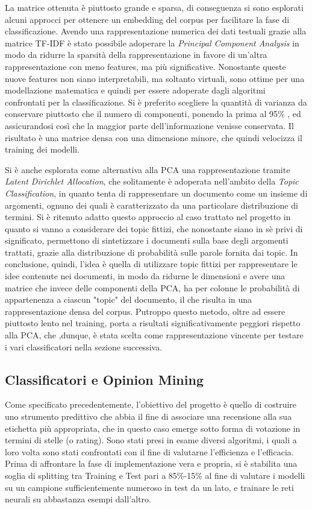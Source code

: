 \documentclass[fleqn,10pt]{SelfArx} %
\begin{document}
La matrice ottenuta è piuttosto grande e sparsa, di conseguenza si sono esplorati alcuni approcci per ottenere un embedding del corpus per facilitare la fase di classificazione.
Avendo una rappresentazione numerica dei dati testuali grazie alla matrice TF-IDF è stato possibile adoperare la \textit{Principal Component Analysis} in modo da ridurre la sparsità della rappresentazione in favore di un'altra rappresentazione con meno features, ma più significative. Nonostante queste nuove features non siano interpretabili, ma soltanto virtuali, sono ottime per una modellazione matematica e quindi per essere adoperate dagli algoritmi confrontati per la classificazione. Si è preferito scegliere la quantità di varianza da conservare piuttosto che il numero di componenti, ponendo la prima al 95\% , ed assicurandosi così che la maggior parte dell'informazione venisse conservata. Il risultato è una matrice densa con una dimensione minore, che quindi velocizza il training dei modelli. 

Si è anche esplorata come alternativa alla PCA una rappresentazione tramite \textit{Latent Dirichlet Allocation}, che solitamente è adoperata nell'ambito della \textit{Topic Classification}, in quanto tenta di rappresentare un documento come un insieme di argomenti, ognuno dei quali è caratterizzato da una particolare distribuzione di termini. Si è ritenuto adatto questo approccio al caso trattato nel progetto in quanto si vanno a considerare dei topic fittizi, che nonostante siano in sè privi di significato, permettono di sintetizzare i documenti sulla base degli argomenti trattati, grazie alla distribuzione di probabilità sulle parole fornita dai topic. In conclusione, quindi, l'idea è quella di utilizzare topic fittizi per rappresentare le idee contenute nei documenti, in modo da ridurne le dimensioni e avere una matrice che invece delle componenti della PCA, ha per colonne le probabilità di appartenenza a ciascun "topic" del documento, il che risulta in una rappresentazione densa del corpus. Putroppo questo metodo, oltre ad essere piuttosto lento nel training, porta a risultati significativamente peggiori rispetto alla PCA, che ,dunque, è stata scelta come rappresentazione vincente per testare i vari classificatori nella sezione successiva.

\subsection{Classificatori e Opinion Mining}

Come specificato precedentemente, l'obiettivo del progetto è quello di costruire uno strumento predittivo che abbia il fine di associare una recensione alla sua etichetta più appropriata, che in questo caso emerge sotto forma di votazione in termini di stelle (o rating). Sono stati presi in esame diversi algoritmi, i quali a loro volta sono stati confrontati con il fine di valutarne l'efficienza e l'efficacia. %
Prima di affrontare la fase di implementazione vera e propria, si è stabilita una soglia di splitting tra Training e Test pari a 85\%-15\% al fine di valutare i modelli su un campione sufficientemente numeroso in test da un lato, e trainare le reti neurali su abbastanza esempi dall'altro.
\end{document}
